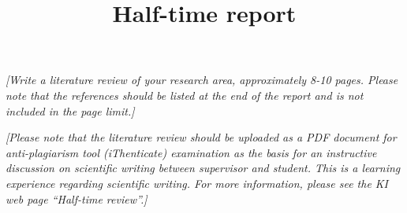 \documentclass{kihalftimedefaultfonts}
\title{Half-time report}
\author{\studentname}
\begin{document}
\maketitle
\thispagestyle{empty}
\newpage

\vspace{2cm}
\vspace{2cm}
\tableofcontents
\vfill
\halftimedate
\thispagestyle{empty}
\newpage


{
\small
\textit{[Write a literature review of your research area, approximately 8-10 pages. Please note that the references should be listed at the end of the report and is not included in the page limit.]}

\noindent \textit{[Please note that the literature review should be uploaded as a PDF document for anti-plagiarism tool (iThenticate) examination as the basis for an instructive discussion on scientific writing between supervisor and student. This is a learning experience regarding scientific writing. For more information, please see the KI web page “Half-time review”.]}
}
\end{document}
